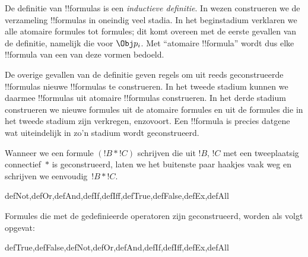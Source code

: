 \documentclass[openany]{memoir}
\begin{document}
\begin{explain}
De definitie van !!{formula}s is een \emph{inductieve definitie}. In
wezen construeren we de verzameling !!{formula}s in oneindig veel
stadia. In het beginstadium verklaren we alle atomaire formules tot
formules; dit komt overeen met de eerste gevallen van de definitie,
namelijk die voor
%
%
$\Obj p_i$. Met ``atomaire !!{formula}'' wordt dus elke !!{formula} van
een van deze vormen bedoeld.

De overige gevallen van de definitie geven regels om uit reeds
geconstrueerde !!{formula}s nieuwe !!{formula}s te construeren. In het
tweede stadium kunnen we daarmee !!{formula}s uit atomaire
!!{formula}s construeren. In het derde stadium construeren we nieuwe
formules uit de atomaire formules en uit de formules die in het tweede
stadium zijn verkregen, enzovoort. Een !!{formula} is precies datgene
wat uiteindelijk in zo'n stadium wordt geconstrueerd.
\end{explain}

Wanneer we een formule $(!B \ast !C)$ schrijven die uit $!B$, $!C$ met
een tweeplaatsig connectief~$\ast$ is geconstrueerd, laten we het
buitenste paar haakjes vaak weg en schrijven we eenvoudig~$!B \ast !C$.

\begin{tagblock}{defNot,defOr,defAnd,defIf,defIff,defTrue,defFalse,defEx,defAll}
\begin{defn}
Formules die met de gedefinieerde operatoren zijn geconstrueerd, worden
als volgt opgevat:

\begin{tagenumerate}{defTrue,defFalse,defNot,defOr,defAnd,defIf,defIff,defEx,defAll}







\end{tagenumerate}
\end{defn}
\end{tagblock}
\end{document}
